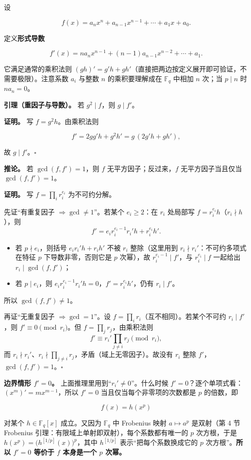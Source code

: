 设

\[
f(x)=a_nx^n+a_{n-1}x^{n-1}+\cdots+a_1x+a_0 .
\]

定义\textbf{形式导数}

\[
f'(x)=n a_nx^{n-1}+(n-1)a_{n-1}x^{n-2}+\cdots+a_1 .
\]

它满足通常的乘积法则 $(gh)'=g'h+gh'$（直接把两边按定义展开即可验证，不需要极限）。注意系数 $a_i$ 与整数 $n$ 的乘积要理解成在 $\mathbb F_q$ 中相加 $n$ 次；当 $p\mid n$ 时 $na_n=0$。

\textbf{引理（重因子与导数）。} 若 $g^2\mid f$，则 $g\mid f'$。

\textbf{证明。} 写 $f=g^2h$。由乘积法则

\[
f'=2gg'h+g^2h'=g\,(2g'h+gh'),
\]

故 $g\mid f'$。$\square$

\textbf{推论。} 若 $\gcd(f,f')=1$，则 $f$ 无平方因子；反过来，$f$ 无平方因子当且仅当 $\gcd(f,f')=1$。

\textbf{证明。} 写 $f=\prod_i r_i^{e_i}$ 为不可约分解。

先证“有重复因子 $\Rightarrow\gcd\ne1$”。若某个 $e_i\ge2$：在 $r_i$ 处局部写 $f=r_i^{e_i}h$（$r_i\nmid h$），则
\[
f'=e_i r_i^{e_i-1}r_i'h+r_i^{e_i}h'.
\]
\begin{itemize}
\item 若 $p\nmid e_i$，则括号 $e_ir_i'h+r_ih'$ 不被 $r_i$ 整除（这里用到 $r_i\nmid r_i'$：不可约多项式在特征 $p$ 下导数非零，否则它是 $p$ 次幂），故 $r_i^{e_i-1}\mid f'$，与 $r_i^{e_i}\mid f$ 一起给出 $r_i\mid\gcd(f,f')$；
\item 若 $p\mid e_i$，则 $e_ir_i^{e_i-1}r_i'h=0$，$f'=r_i^{e_i}h'$，仍有 $r_i\mid f'$。
\end{itemize}


所以 $\gcd(f,f')\ne1$。

再证“无重复因子 $\Rightarrow\gcd=1$”。设 $f=\prod_i r_i$（互不相同）。若某个不可约 $r_i\mid f'$，则 $f'\equiv0\pmod{r_i}$。但 $f=\prod_j r_j$，由乘积法则
\[
f'\equiv r_i'\prod_{j\ne i}r_j \pmod{r_i},
\]
而 $r_i\nmid r_i'$、$r_i\nmid\prod_{j\ne i}r_j$，矛盾（域上无零因子）。故没有 $r_i$ 整除 $f'$，$\gcd(f,f')=1$。$\square$

\textbf{边界情形 $f'=0$。} 上面推理里用到“$r_i'\ne0$”。什么时候 $f'=0$？逐个单项式看：$(x^{m})'=mx^{m-1}$，所以 $f'=0$ 当且仅当每个非零项的次数都是 $p$ 的倍数，即

\[
f(x)=h(x^p)
\]

对某个 $h\in\mathbb F_q[x]$ 成立。又因为 $\mathbb F_q$ 中 Frobenius 映射 $a\mapsto a^p$ 是双射（第 4 节 Frobenius 引理：有限域上单射即双射），每个系数都有唯一的 $p$ 次方根，于是 $h(x^p)=\bigl(h^{[1/p]}(x)\bigr)^p$，其中 $h^{[1/p]}$ 表示“把每个系数换成它的 $p$ 次方根”。\textbf{所以 $f'=0$ 等价于 $f$ 本身是一个 $p$ 次幂。}

